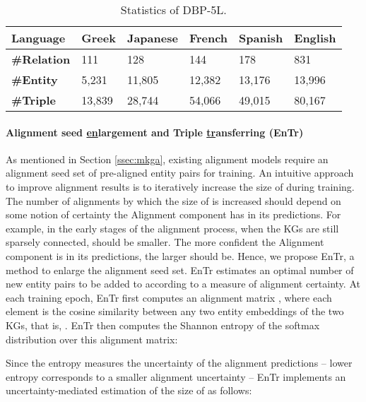 \documentclass[11pt]{article}
\begin{document}
\begin{table*}[!t]
\centering
\def\arraystretch{1.1}
    \begin{tabular}{l|l|l|l|l|l}
    \hline
         \bf Language & \bf Greek & \bf Japanese & \bf French & \bf Spanish & \bf English \\
         \hline
         \bf \#Relation & 111 & 128 & 144 & 178 & 831 \\
         \hline
         \bf \#Entity & 5,231 & 11,805 & 12,382 & 13,176 & 13,996 \\
         \hline
         \bf \#Triple & 13,839 & 28,744 & 54,066 & 49,015 & 80,167 \\
         \hline 
\end{tabular}
\caption{Statistics of DBP-5L.}
    \label{tab:datasetstats}
\end{table*}


\paragraph{Alignment seed \underline{en}largement and Triple \underline{tr}ansferring (EnTr)} As mentioned in Section \ref{ssec:mkga}, existing alignment models require an alignment seed set  of pre-aligned entity pairs for training. An intuitive approach to improve alignment results is to iteratively increase the size of  during training. The number of alignments by which the size of  is increased should depend on some notion of certainty the Alignment component has in its predictions. For example, in the early stages of the alignment process, when the KGs are still sparsely connected,  should be smaller. The more confident the Alignment component is in its predictions, the larger should  be.  
Hence, we propose EnTr, a method to enlarge the  alignment seed set. EnTr estimates an optimal number of new entity pairs to be added to  according to a measure of alignment certainty. At each training epoch, EnTr first computes an alignment matrix , where each element is the cosine similarity between any two entity embeddings of the two KGs, that is, . EnTr then computes the Shannon entropy of the softmax distribution over this alignment matrix:



Since the entropy measures the uncertainty of the alignment predictions -- lower entropy corresponds to a smaller alignment uncertainty -- EnTr implements an uncertainty-mediated estimation of the size  of  as follows: 
\end{document}
